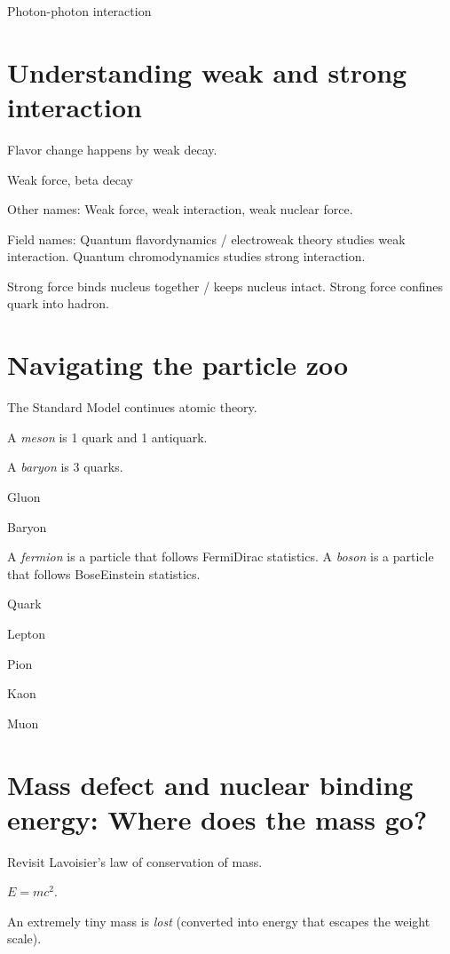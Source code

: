 Photon-photon interaction

\section{Understanding weak and strong interaction}

Flavor change happens by weak decay.

Weak force, beta decay


Other names: Weak force, weak interaction, weak nuclear force.

Field names:
Quantum flavordynamics / electroweak theory studies weak interaction.
Quantum chromodynamics studies strong interaction.

Strong force binds nucleus together / keeps nucleus intact.
Strong force confines quark into hadron.

\section{Navigating the particle zoo}

The Standard Model continues atomic theory.


A \emph{meson} is 1 quark and 1 antiquark.

A \emph{baryon} is 3 quarks.

Gluon

Baryon

A \emph{fermion} is a particle that follows Fermi\textendash{}Dirac statistics.
A \emph{boson} is a particle that follows Bose\textendash{}Einstein statistics.

Quark

Lepton

Pion

Kaon

Muon

\section{Mass defect and nuclear binding energy: Where does the mass go?}

Revisit Lavoisier's law of conservation of mass.

\( E = mc^2 \).

An extremely tiny mass is \emph{lost} (converted into energy that escapes the weight scale).

